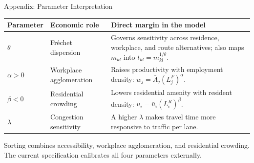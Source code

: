 \documentclass[11pt,aspectratio=169]{beamer}
\newcommand{\navback}[1]{\par\vspace{0.35em}\noindent\hfill\hyperlink{#1}{\beamerreturnbutton{back}}}
\begin{document}
\begin{frame}[label=appparams]{Appendix: Parameter Interpretation}
\centering
\vspace{0.25em}
\scriptsize
\renewcommand{\arraystretch}{1.32}
\begin{tabularx}{0.94\textwidth}{@{}p{}p{}X@{}}
\toprule
Parameter & Economic role & Direct margin in the model \\
\midrule
$\theta$ & Fr\'echet dispersion & Governs sensitivity across residence, workplace, and route alternatives; also maps $m_{kl}$ into $t_{kl}=m_{kl}^{1/\theta}$. \\
$\alpha>0$ & Workplace agglomeration & Raises productivity with employment density: $w_j=\bar A_j(L_j^F)^\alpha$. \\
$\beta<0$ & Residential crowding & Lowers residential amenity with resident density: $u_i=\bar u_i(L_i^R)^\beta$. \\
$\lambda$ & Congestion sensitivity & A higher $\lambda$ makes travel time more responsive to traffic per lane. \\
\bottomrule
\end{tabularx}
\vspace{0.55em}

\begin{minipage}{0.92\textwidth}
\footnotesize Sorting combines accessibility, workplace agglomeration, and residential crowding. The current specification calibrates all four parameters externally.
\end{minipage}
\navback{estparams}
\end{frame}
\end{document}

